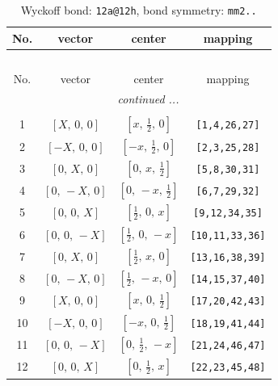 \documentclass[fleqn,8pt]{jsarticle}
\begin{document}
\begin{longtable}{cccc}
\caption{Wyckoff bond: {\tt 12a@12h}, bond symmetry: {\tt mm2..}}
 \\
 \hline \hline
No. & vector & center & mapping \\ \hline \endfirsthead

\multicolumn{3}{l}{\tablename\ \thetable{}} \\
 \hline \hline
No. & vector & center & mapping \\ \hline \endhead

 \hline \hline
\multicolumn{3}{r}{\footnotesize\it continued ...} \\ \endfoot

 \hline \hline
\multicolumn{3}{r}{} \\ \endlastfoot

1 & $\left[ X,\, 0,\, 0 \right]$ & $\left[ x,\, \frac{1}{2},\, 0 \right]$ & {\tt [1,4,26,27]} \\ \hline
2 & $\left[ - X,\, 0,\, 0 \right]$ & $\left[ - x,\, \frac{1}{2},\, 0 \right]$ & {\tt [2,3,25,28]} \\ \hline
3 & $\left[ 0,\, X,\, 0 \right]$ & $\left[ 0,\, x,\, \frac{1}{2} \right]$ & {\tt [5,8,30,31]} \\ \hline
4 & $\left[ 0,\, - X,\, 0 \right]$ & $\left[ 0,\, - x,\, \frac{1}{2} \right]$ & {\tt [6,7,29,32]} \\ \hline
5 & $\left[ 0,\, 0,\, X \right]$ & $\left[ \frac{1}{2},\, 0,\, x \right]$ & {\tt [9,12,34,35]} \\ \hline
6 & $\left[ 0,\, 0,\, - X \right]$ & $\left[ \frac{1}{2},\, 0,\, - x \right]$ & {\tt [10,11,33,36]} \\ \hline
7 & $\left[ 0,\, X,\, 0 \right]$ & $\left[ \frac{1}{2},\, x,\, 0 \right]$ & {\tt [13,16,38,39]} \\ \hline
8 & $\left[ 0,\, - X,\, 0 \right]$ & $\left[ \frac{1}{2},\, - x,\, 0 \right]$ & {\tt [14,15,37,40]} \\ \hline
9 & $\left[ X,\, 0,\, 0 \right]$ & $\left[ x,\, 0,\, \frac{1}{2} \right]$ & {\tt [17,20,42,43]} \\ \hline
10 & $\left[ - X,\, 0,\, 0 \right]$ & $\left[ - x,\, 0,\, \frac{1}{2} \right]$ & {\tt [18,19,41,44]} \\ \hline
11 & $\left[ 0,\, 0,\, - X \right]$ & $\left[ 0,\, \frac{1}{2},\, - x \right]$ & {\tt [21,24,46,47]} \\ \hline
12 & $\left[ 0,\, 0,\, X \right]$ & $\left[ 0,\, \frac{1}{2},\, x \right]$ & {\tt [22,23,45,48]} \\
\end{longtable}
\end{document}
